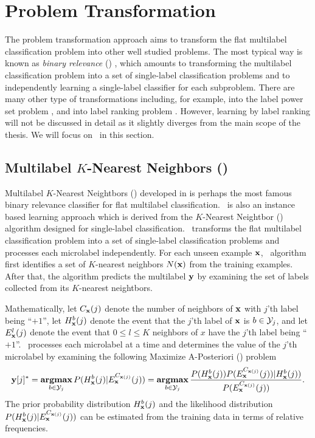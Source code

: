 {%
%
\section{Problem Transformation}

The problem transformation approach aims to transform the flat multilabel classification problem into other well studied problems.
The most typical way is known as \textit{binary relevance} (\br) \citep{Tsoumakas07multi,Tsoumakas10mining}, which amounts to transforming the multilabel classification problem into a set of single-label classification problems and to independently learning a single-label classifier for each subproblem.
There are many other type of transformations including, for example, into the label power set problem \citep{Tsoumakas07random}, and into label ranking problem \citep{Elisseeff01akernel,Brinker07case,Furnkranz08multilabel,Chiang12a}.
However, learning by label ranking will not be discussed in detail as it slightly diverges from the main scope of the thesis.
We will focus on \br\ in this section.



%
%
\subsection{Multilabel $K$-Nearest Neighbors (\mlknn)} \label{sc_mlknn}

Multilabel $K$-Nearest Neightbors (\mlknn) developed in \citep{Zhang05a,Zhang07mlknn} is perhaps the most famous binary relevance classifier for flat multilabel classification.
\mlknn\ is also an instance based learning approach \citep{Aha91instance} which is derived from the $K$-Nearest Neightbor (\knn) algorithm designed for single-label classification.
\mlknn\ transforms the flat multilabel classification problem into a set of single-label classification problems and processes each microlabel independently.
For each unseen example $\mathbf {x}$, \mlknn\ algorithm first identifies a set of $K$-nearest neighbors $N(\mathbf {x})$ from the training examples.
After that, the algorithm predicts the multilabel $\mathbf {y}$ by examining the set of labels collected from its $K$-nearest neightbors.

Mathematically,
let $C_{\mathbf {x}}(j)$ denote the number of neighbors of $\mathbf {x}$ with $j$'th label being ``$+1$'',
let $H^b_{\mathbf {x}}(j)$ denote the event that the $j$'th label of $\mathbf {x}$ is $b\in\mathcal{Y}_j$,
and let $E_{\mathbf {x}}^l(j)$ denote the event that $0\le l \le K$ neighbors of $x$ have the $j$'th label being ``$+1$''.
\mlknn\ processes each microlabel at a time and determines the value of the $j$'th microlabel by examining the following Maximize A-Posteriori (\map) problem
\begin{align*}
	\mathbf {y}[j]^* = \underset{b\in\mathcal{Y}_j}{\textbf{argmax}} \, P( H^b_{\mathbf {x}}(j) | E_{\mathbf {x}}^{C_{\mathbf {x}(j)}}(j) )
	= \underset{b\in\mathcal{Y}_j}{\textbf{argmax}} \, \frac{P( H^b_{\mathbf {x}}(j) ) P(  E_{\mathbf {x}}^{C_{\mathbf {x}(j)}}(j) ) | H^b_{\mathbf {x}}(j))}{P( E_{\mathbf {x}}^{C_{\mathbf {x}(j)}}(j))}.
\end{align*}
The prior probability distribution $H^b_{\mathbf {x}}(j)$ and the likelihood distribution $P( H^b_{\mathbf {x}}(j) | E_{\mathbf {x}}^{C_{\mathbf {x}(j)}}(j) )$ can be estimated from the training data in terms of relative frequencies.

}
